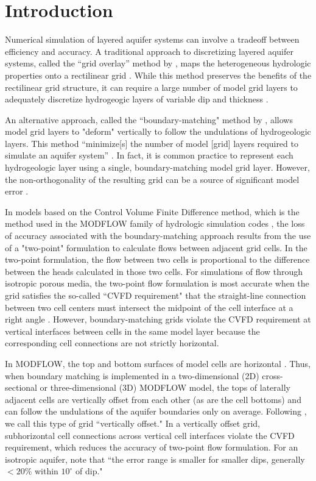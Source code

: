\documentclass{article}
\begin{document}
\section{Introduction}

Numerical simulation of layered aquifer systems can involve a tradeoff between efficiency and accuracy. A traditional approach to discretizing layered aquifer systems, called the ``grid overlay'' method by \cite{hoaglund2003}, maps the heterogeneous hydrologic properties onto a rectilinear grid \citep{modflow84}. While this method preserves the benefits of the rectilinear grid structure, it can require a large number of model grid layers to adequately discretize hydrogeogic layers of variable dip and thickness \citep{Zyvoloski2006}.

An alternative approach, called the ``boundary-matching" method by \cite{hoaglund2003}, allows model grid layers to "deform" vertically to follow the undulations of hydrogeologic layers. This method ``minimize[s] the number of model [grid] layers required to simulate an aquifer system'' \citep{modflow84}. In fact, it is common practice to represent each hydrogeologic layer using a single, boundary-matching model grid layer. However, the non-orthogonality of the resulting grid can be a source of significant model error \citep{hoaglund2003}.

In models based on the Control Volume Finite Difference method, which is the method used in the MODFLOW family of hydrologic simulation codes \citep{modflow6gwf, langevin2024}, the loss of accuracy associated with the boundary-matching approach results from the use of a "two-point" formulation to calculate flows between adjacent grid cells. In the two-point formulation, the flow between two cells is proportional to the difference between the heads calculated in those two cells. For simulations of flow through isotropic porous media, the two-point flow formulation is most accurate when the grid satisfies the so-called ``CVFD requirement" \citep{modflowusg, modflow6gwf} that the straight-line connection between two cell centers must intersect the midpoint of the cell interface at a right angle \citep{narasimhan1976integrated}. However, boundary-matching grids violate the CVFD requirement at vertical interfaces between cells in the same model layer because the corresponding cell connections are not strictly horizontal.

In MODFLOW, the top and bottom surfaces of model cells are horizontal \citep{modflow6gwf}. Thus, when boundary matching is implemented in a two-dimensional (2D) cross-sectional or three-dimensional (3D) MODFLOW model, the tops of laterally adjacent cells are vertically offset from each other (as are the cell bottoms) and can follow the undulations of the aquifer boundaries only on average. Following \cite{bardot2023}, we call this type of grid ``vertically offset." In a vertically offset grid, subhorizontal cell connections across vertical cell interfaces violate the CVFD requirement, which reduces the accuracy of two-point flow formulation. For an isotropic aquifer, \cite{hoaglund2003} note that ``the error range is smaller for smaller dips, generally $<20$\% within $10^{\circ}$ of dip."
\end{document}
